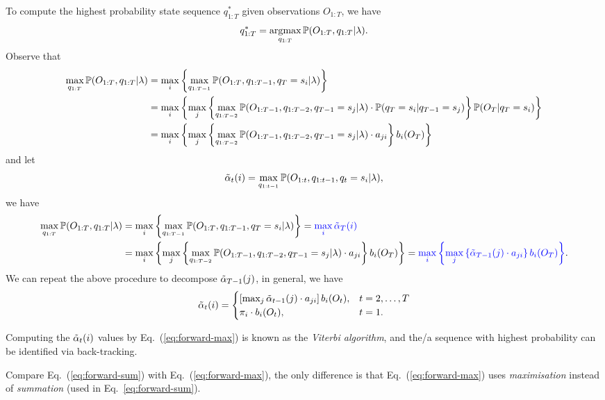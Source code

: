 To compute the highest probability state sequence $q_{1:T}^*$ given observations $O_{1:T}$, we have
\begin{equation*}
q_{1:T}^* = \operatorname*{argmax}_{q_{1:T}} \mathbb{P}(O_{1:T}, q_{1:T} |\lambda).
\end{equation*}
Observe that 
\begin{align*}
\max_{q_{1:T}} \mathbb{P}(O_{1:T}, q_{1:T} |\lambda) 
&= \max_{i} \left\{ \max_{q_{1:T-1}} \mathbb{P}(O_{1:T}, q_{1:T-1}, q_T = s_i |\lambda) \right\} \\
&= \max_{i} \left\{ \max_{j} \left\{ \max_{q_{1:T-2}} \mathbb{P}(O_{1:T-1}, q_{1:T-2}, q_{T-1} = s_j |\lambda) \cdot 
   \mathbb{P}(q_T = s_i |q_{T-1} = s_j) \right\} \mathbb{P}(O_T |q_T = s_i) \right\} \\
&= \max_{i} \left\{ \max_{j} \left\{ \max_{q_{1:T-2}} \mathbb{P}(O_{1:T-1}, q_{1:T-2}, q_{T-1} = s_j |\lambda) \cdot a_{ji} \right\} b_i(O_T) \right\}
\end{align*}
and let 
\begin{equation}
\label{eq:alphat}
\tilde{\alpha}_{t}(i) = \max_{q_{1:t-1}} \mathbb{P}(O_{1:t}, q_{1:t-1}, q_t = s_i |\lambda),
\end{equation}
we have
\begin{align*}
\max_{q_{1:T}} \mathbb{P}(O_{1:T}, q_{1:T} |\lambda) 
&= \max_{i} \left\{ \max_{q_{1:T-1}} \mathbb{P}(O_{1:T}, q_{1:T-1}, q_T = s_i |\lambda) \right\} 
 = {\color{blue}{\max_{i} \tilde{\alpha}_{T}(i)}} \\
&= \max_{i} \left\{ \max_{j} \left\{ \max_{q_{1:T-2}} \mathbb{P}(O_{1:T-1}, q_{1:T-2}, q_{T-1} = s_j |\lambda) \cdot a_{ji} \right\} b_i(O_T) \right\}
 = {\color{blue}{\max_{i} \left\{ \max_{j} \left\{ \tilde{\alpha}_{T-1}(j) \cdot a_{ji} \right\} b_i(O_T) \right\}}}.
\end{align*}
We can repeat the above procedure to decompose $\tilde{\alpha}_{T-1}(j)$, in general, we have
\begin{equation}
\label{eq:forward-max}
\tilde{\alpha}_t(i) = \begin{cases}
                \left[ \max_{j} \tilde{\alpha}_{t-1}(j) \cdot a_{ji} \right] b_i(O_t), & t=2,\dots,T \\
                \pi_i \cdot b_i(O_t), & t=1.
               \end{cases}
\end{equation}

Computing the $\tilde{\alpha}_t(i)$ values by Eq.~(\ref{eq:forward-max}) is known as the \emph{Viterbi algorithm}, 
and the/a sequence with highest probability can be identified via back-tracking.

Compare Eq.~(\ref{eq:forward-sum}) with Eq.~(\ref{eq:forward-max}), 
the only difference is that Eq.~(\ref{eq:forward-max}) uses \emph{maximisation} instead of \emph{summation} (used in Eq.~\ref{eq:forward-sum}).



